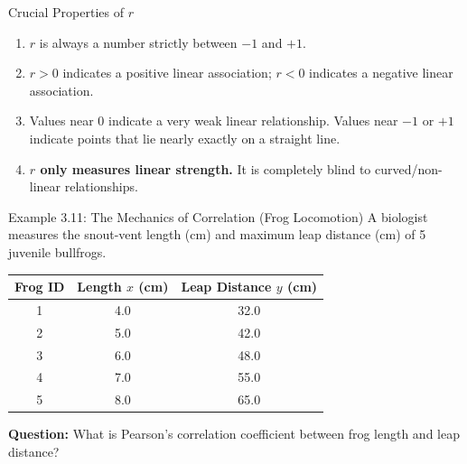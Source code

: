 \documentclass[aspectratio=169]{beamer}
\begin{document}
\begin{frame}{Crucial Properties of $r$}
  \begin{enumerate}
    \item $r$ is always a number strictly between $-1$ and $+1$.
    \item $r > 0$ indicates a positive linear association; $r < 0$ indicates a negative linear association.
    \item Values near 0 indicate a very weak linear relationship. Values near $-1$ or $+1$ indicate points that lie nearly exactly on a straight line.
    \item \textbf{$r$ only measures linear strength.} It is completely blind to curved/non-linear relationships.
  \end{enumerate}
\end{frame}

\begin{frame}{Example 3.11: The Mechanics of Correlation (Frog Locomotion)}
A biologist measures the snout-vent length (cm) and maximum leap distance (cm) of 5 juvenile bullfrogs.
\vspace{0.3cm}
\begin{table}
\centering
\begin{tabular}{ccc}
\toprule
\textbf{Frog ID} & \textbf{Length $x$ (cm)} & \textbf{Leap Distance $y$ (cm)} \\
\midrule
1 & 4.0 & 32.0 \\
2 & 5.0 & 42.0 \\
3 & 6.0 & 48.0 \\
4 & 7.0 & 55.0 \\
5 & 8.0 & 65.0 \\
\bottomrule
\end{tabular}
 \end{table}

\textbf{Question:} What is Pearson's correlation coefficient between frog length and leap distance?
\end{frame}
\end{document}
